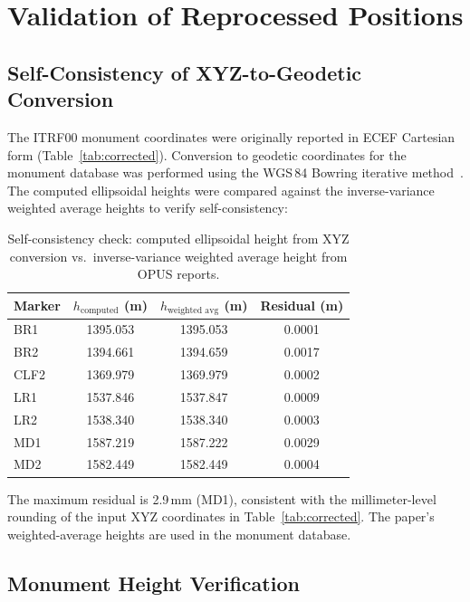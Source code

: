\documentclass[11pt,letterpaper]{article}
\begin{document}
\section{Validation of Reprocessed Positions}

\subsection{Self-Consistency of XYZ-to-Geodetic Conversion}

The ITRF00 monument coordinates were originally reported in ECEF Cartesian form (Table~\ref{tab:corrected}). Conversion to geodetic coordinates for the monument database was performed using the WGS\,84 Bowring iterative method~\cite{bowring1976}. The computed ellipsoidal heights were compared against the inverse-variance weighted average heights to verify self-consistency:

\begin{table}[H]
\centering
\caption{Self-consistency check: computed ellipsoidal height from XYZ conversion vs.\ inverse-variance weighted average height from OPUS reports.}
\label{tab:xyz_validation}
\smallskip
\begin{tabular}{@{}lS[table-format=4.3]S[table-format=4.3]S[table-format=1.4]@{}}
\toprule
{Marker} & {$h_{\text{computed}}$ (m)} & {$h_{\text{weighted avg}}$ (m)} & {Residual (m)} \\
\midrule
BR1  & 1395.053 & 1395.053 & 0.0001 \\
BR2  & 1394.661 & 1394.659 & 0.0017 \\
CLF2 & 1369.979 & 1369.979 & 0.0002 \\
LR1  & 1537.846 & 1537.847 & 0.0009 \\
LR2  & 1538.340 & 1538.340 & 0.0003 \\
MD1  & 1587.219 & 1587.222 & 0.0029 \\
MD2  & 1582.449 & 1582.449 & 0.0004 \\
\bottomrule
\end{tabular}
\end{table}

\noindent The maximum residual is 2.9\,mm (MD1), consistent with the millimeter-level rounding of the input XYZ coordinates in Table~\ref{tab:corrected}. The paper's weighted-average heights are used in the monument database.

\subsection{Monument Height Verification}
\end{document}
